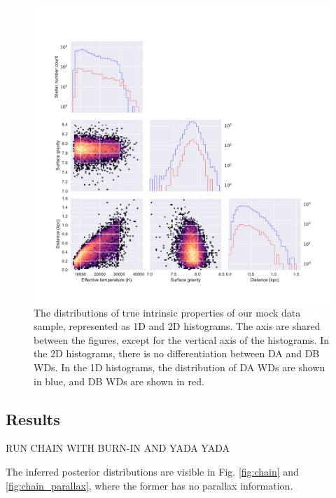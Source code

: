 \documentclass[fleqn,usenatbib]{mnras}
\begin{document}
\begin{figure}
	\includegraphics[width=.9\textwidth]{10000WDs.pdf}
    \caption{The distributions of true intrinsic properties of our mock data sample, represented as 1D and 2D histograms. The axis are shared between the figures, except for the vertical axis of the histograms. In the 2D histograms, there is no differentiation between DA and DB WDs. In the 1D histograms, the distribution of DA WDs are shown in blue, and DB WDs are shown in red.}
    \label{fig:10000WDs}
\end{figure}



\subsection{Results}

RUN CHAIN WITH BURN-IN AND YADA YADA

The inferred posterior distributions are visible in Fig. \ref{fig:chain} and \ref{fig:chain_parallax}, where the former has no parallax information.
\end{document}
